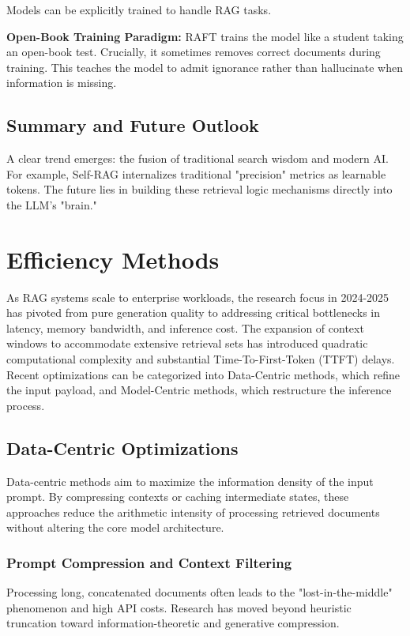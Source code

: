 \documentclass[11pt]{article}
\begin{document}
Models can be explicitly trained to handle RAG tasks.

\textbf{Open-Book Training Paradigm:} RAFT \citep{zhang2024raft} trains the model like a student taking an open-book test. Crucially, it sometimes removes correct documents during training. This teaches the model to admit ignorance rather than hallucinate when information is missing.

\subsection{Summary and Future Outlook}

A clear trend emerges: the fusion of traditional search wisdom and modern AI. For example, Self-RAG internalizes traditional "precision" metrics as learnable tokens. The future lies in building these retrieval logic mechanisms directly into the LLM's "brain."
\section{Efficiency Methods}

As RAG systems scale to enterprise workloads, the research focus in 2024-2025 has pivoted from pure generation quality to addressing critical bottlenecks in latency, memory bandwidth, and inference cost. The expansion of context windows to accommodate extensive retrieval sets has introduced quadratic computational complexity and substantial Time-To-First-Token (TTFT) delays. Recent optimizations can be categorized into Data-Centric methods, which refine the input payload, and Model-Centric methods, which restructure the inference process.


\subsection{Data-Centric Optimizations}

Data-centric methods aim to maximize the information density of the input prompt. By compressing contexts or caching intermediate states, these approaches reduce the arithmetic intensity of processing retrieved documents without altering the core model architecture.

\subsubsection{Prompt Compression and Context Filtering}

Processing long, concatenated documents often leads to the "lost-in-the-middle" phenomenon and high API costs. Research has moved beyond heuristic truncation toward information-theoretic and generative compression.
\end{document}
